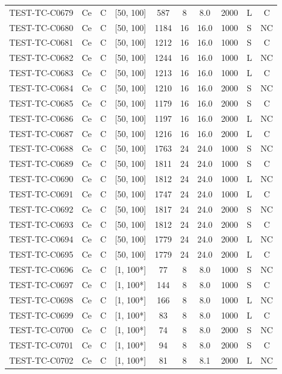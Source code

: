 \begin{longtable}{lccccccccc}
TEST-TC-C0679 & Ce & C & [50, 100] & 587 & 8 & 8.0 & 2000 & L & C \\
TEST-TC-C0680 & Ce & C & [50, 100] & 1184 & 16 & 16.0 & 1000 & S & NC \\
TEST-TC-C0681 & Ce & C & [50, 100] & 1212 & 16 & 16.0 & 1000 & S & C \\
TEST-TC-C0682 & Ce & C & [50, 100] & 1244 & 16 & 16.0 & 1000 & L & NC \\
TEST-TC-C0683 & Ce & C & [50, 100] & 1213 & 16 & 16.0 & 1000 & L & C \\
TEST-TC-C0684 & Ce & C & [50, 100] & 1210 & 16 & 16.0 & 2000 & S & NC \\
TEST-TC-C0685 & Ce & C & [50, 100] & 1179 & 16 & 16.0 & 2000 & S & C \\
TEST-TC-C0686 & Ce & C & [50, 100] & 1197 & 16 & 16.0 & 2000 & L & NC \\
TEST-TC-C0687 & Ce & C & [50, 100] & 1216 & 16 & 16.0 & 2000 & L & C \\
TEST-TC-C0688 & Ce & C & [50, 100] & 1763 & 24 & 24.0 & 1000 & S & NC \\
TEST-TC-C0689 & Ce & C & [50, 100] & 1811 & 24 & 24.0 & 1000 & S & C \\
TEST-TC-C0690 & Ce & C & [50, 100] & 1812 & 24 & 24.0 & 1000 & L & NC \\
TEST-TC-C0691 & Ce & C & [50, 100] & 1747 & 24 & 24.0 & 1000 & L & C \\
TEST-TC-C0692 & Ce & C & [50, 100] & 1817 & 24 & 24.0 & 2000 & S & NC \\
TEST-TC-C0693 & Ce & C & [50, 100] & 1812 & 24 & 24.0 & 2000 & S & C \\
TEST-TC-C0694 & Ce & C & [50, 100] & 1779 & 24 & 24.0 & 2000 & L & NC \\
TEST-TC-C0695 & Ce & C & [50, 100] & 1779 & 24 & 24.0 & 2000 & L & C \\
TEST-TC-C0696 & Ce & C & [1, 100*] & 77 & 8 & 8.0 & 1000 & S & NC \\
TEST-TC-C0697 & Ce & C & [1, 100*] & 144 & 8 & 8.0 & 1000 & S & C \\
TEST-TC-C0698 & Ce & C & [1, 100*] & 166 & 8 & 8.0 & 1000 & L & NC \\
TEST-TC-C0699 & Ce & C & [1, 100*] & 83 & 8 & 8.0 & 1000 & L & C \\
TEST-TC-C0700 & Ce & C & [1, 100*] & 74 & 8 & 8.0 & 2000 & S & NC \\
TEST-TC-C0701 & Ce & C & [1, 100*] & 94 & 8 & 8.0 & 2000 & S & C \\
TEST-TC-C0702 & Ce & C & [1, 100*] & 81 & 8 & 8.1 & 2000 & L & NC \\

\end{longtable}
